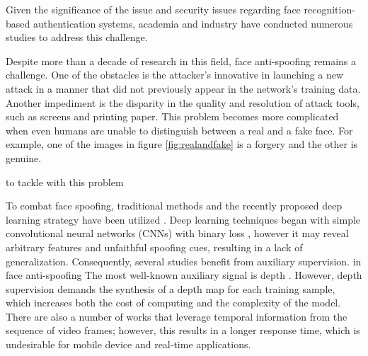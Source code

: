 \documentclass[journal]{IEEEtran}
\begin{document}
Given the significance of the issue and security issues regarding face recognition-based authentication systems, academia and industry have conducted numerous studies to address this challenge. 

Despite more than a decade of research in this field, face anti-spoofing remains a challenge.
One of the obstacles is the attacker's innovative in launching a new attack in a manner that did not previously appear in the network's training data.
Another impediment is the disparity in the quality and resolution of attack tools, such as screens and printing paper.
This problem becomes more complicated when even humans are unable to distinguish between a real and a fake face.
For example, one of the images in figure \ref{fig:realandfake} is a forgery and the other is genuine. 

to tackle with this problem 


To combat face spoofing, traditional methods \cite{ramachandra2017presentation} and the recently proposed deep learning strategy have been utilized \cite{yu2021deep}.
Deep learning techniques began with simple convolutional neural networks (CNNs) with binary loss \cite{yang2014learn}, however it may reveal arbitrary features and unfaithful spoofing cues, resulting in a lack of generalization.
Consequently, several studies benefit from auxiliary supervision\cite{liu2018learning}.
in face anti-spoofing The most well-known auxiliary signal is depth \cite{atoum2017face,yu2020searching,shao2019multi,liu2018learning,wang2020deep,wang2018exploiting}.
However, depth supervision demands the synthesis of a depth map for each training sample, which increases both the cost of computing and the complexity of the model.
There are also a number of works that leverage temporal information from the sequence of video frames\cite{gan20173d,li2018learning,xu2015learning,yang2019face}; however, this results in a longer response time, which is undesirable for mobile device and real-time applications. 
\end{document}
